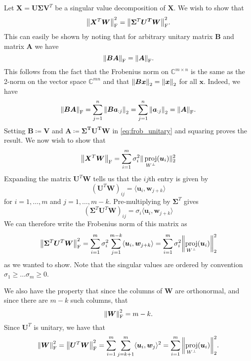 \documentclass[article, a4paper, oneside, 12pt]{memoir}
\DeclareMathOperator{\proj}{proj}
\newcommand{\mat}[1]{\bm{#1}}
\newcommand{\frob}[1]{\norm{#1}_{\mathrm{F}}}
\begin{document}
Let \( \mat{X} = \mat{U}\mat{\Sigma}\mat{V}^T \) be a singular value
decomposition of \( \mat{X} \). We wish to show that
\begin{equation}
    \frob{\mat{X}^T \mat{W}}^2 = \frob{\mat{\Sigma}^T\mat{U^T}\mat{W}}^2.
\end{equation}
This can easily be shown by noting that for arbitrary unitary matrix \( \mat{B}
\) and matrix \( \mat{A} \) we  have
\begin{equation}
    \label{eq:frob_unitary}
    \frob{\mat{BA}} = \frob{\mat{A}}.
\end{equation}
This follows from the fact that the Frobenius norm on \( \mathbb{C}^{m\times n}
\) is the same as the 2-norm on the vector space \( \mathbb{C}^{mn} \) and that
\( \norm{\mat{Bx} }_2 = \norm{ \mat{x} }_2 \) for all \( \mat{x} \).  Indeed, we
have
\begin{align}
    \frob{\mat{BA}} = \sum_{j = 1}^n \norm{ \mat{Ba}_{:j}}_2 = \sum_{j = 1}^n \norm {
    \mat{a}_{:j} }_2 = \frob{\mat{A}}.
\end{align}
Setting \( \mat{B} \coloneqq \mat{V} \) and \( \mat{A} \coloneqq \mat{\Sigma^T
U^T W}\) in \cref{eq:frob_unitary} and squaring proves the result.  We now wish
to show that
\begin{equation}
    \frob{\mat{X}^T\mat{W}} = \sum_{i=1}^m
    \sigma_i^2\|\proj_{W^\perp}(\mat{u}_i)\|_2^2
\end{equation}
Expanding the matrix \( \mat{U}^T\mat{W} \) tells us that the \(ij\)th entry is
given by
\begin{equation}
    (\mat{U}^T\mat{W})_{ij} = \langle \mat{u}_i, \mat{w}_{j + k}\rangle
\end{equation}
for \( i = 1, \ldots, m \) and \( j = 1, \ldots, m - k \). Pre-multiplying by
\( \mat{\Sigma}^T \) gives
\begin{equation}
    (\mat{\Sigma}^T\mat{U}^T\mat{W})_{ij} = \sigma_i \langle \mat{u}_i, \mat{w}_{j+k} \rangle
\end{equation}
We can therefore write the Frobenius norm of this matrix as
\begin{align*}
    \frob{\mat{\Sigma}^T\mat{U}^T\mat{W}}^2 = \sum_{i=1}^m \sigma_i^2 \sum_{j=1}^{m-k} \langle \mat{u}_i, \mat{w}_{j+k}\rangle  = \sum_{i=1}^m \sigma_i^2 \norm{\proj_{W^\perp}(\mat{u}_i)}_2^2
\end{align*}
as we wanted to show. Note that the singular values are ordered by convention
\( \sigma_1 \geq \ldots \sigma_m \geq 0 \).

We also have the property that since the columns of \( \mat{W} \) are
orthonormal, and since there are \( m - k \) such columns, that 
\begin{equation}
    \frob{\mat{W}}^2 = m - k.
\end{equation}
Since \( \mat{U}^T \) is unitary, we have that
\begin{align}
    \frob{\mat{W}}^2 = \frob{\mat{U}^T\mat{W}}^2 = \sum_{i=1}^m \sum_{j=k+1}^m \langle \mat{u}_i, \mat{w}_j \rangle^2 = \sum_{i=1}^m \norm{\proj_{W^\perp}(\mat{u}_i)}^2_2.
\end{align}
\end{document}

